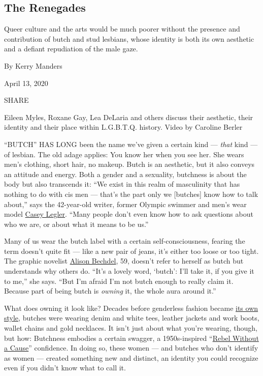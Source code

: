 \hypertarget{the-renegades}{%
\subsection{The Renegades}\label{the-renegades}}

Queer culture and the arts would be much poorer without the presence and
contribution of butch and stud lesbians, whose identity is both its own
aesthetic and a defiant repudiation of the male gaze.

By Kerry Manders

April 13, 2020

SHARE

Eileen Myles, Roxane Gay, Lea DeLaria and others discuss their
aesthetic, their identity and their place within L.G.B.T.Q. history.
Video by Caroline Berler

``BUTCH'' HAS LONG been the name we've given a certain kind ---
\emph{that} kind --- of lesbian. The old adage applies: You know her
when you see her. She wears men's clothing, short hair, no makeup. Butch
is an aesthetic, but it also conveys an attitude and energy. Both a
gender and a sexuality, butchness is about the body but also transcends
it: ``We exist in this realm of masculinity that has nothing to do with
cis men --- that's the part only we {[}butches{]} know how to talk
about,'' says the 42-year-old writer, former Olympic swimmer and men's
wear model
\href{https://www.nytimes.com/2018/08/08/style/casey-legler-olympic-swimmer-model.html}{Casey
Legler}. ``Many people don't even know how to ask questions about who we
are, or about what it means to be us.''

Many of us wear the butch label with a certain self-consciousness,
fearing the term doesn't quite fit --- like a new pair of jeans, it's
either too loose or too tight. The graphic novelist
\href{https://www.nytimes.com/2016/02/05/t-magazine/entertainment/my-10-favorite-books-alison-bechdel.html}{Alison
Bechdel}, 59, doesn't refer to herself as butch but understands why
others do. ``It's a lovely word, `butch': I'll take it, if you give it
to me,'' she says. ``But I'm afraid I'm not butch enough to really claim
it. Because part of being butch is \emph{owning} it, the whole aura
around it.''

What does owning it look like? Decades before genderless fashion became
\href{https://www.nytimes.com/2019/08/05/t-magazine/fall-fashion-androgyny.html}{its
own style}, butches were wearing denim and white tees, leather jackets
and work boots, wallet chains and gold necklaces. It isn't just about
what you're wearing, though, but how: Butchness embodies a certain
swagger, a 1950s-inspired
``\href{https://www.nytimes.com/watching/recommendations/watching-film-rebel-without-a-cause}{Rebel
Without a Cause}'' confidence. In doing so, these women --- and butches
who don't identify as women --- created something new and distinct, an
identity you could recognize even if you didn't know what to call it.

